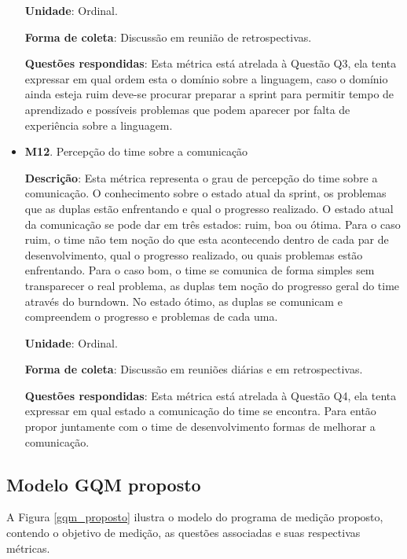 \begin{itemize}
	   \subitem \textbf{Unidade}: Ordinal. 
	   
	   \subitem \textbf{Forma de coleta}: Discussão em reunião de retrospectivas.
	   
	   \subitem \textbf{Questões respondidas}: Esta métrica está atrelada à Questão Q3, ela tenta expressar em 
	   qual ordem esta o domínio sobre a linguagem, caso o domínio ainda esteja ruim deve-se procurar preparar a 
	   sprint para permitir tempo de aprendizado e possíveis problemas que podem aparecer por falta de experiência 
	   sobre a linguagem.
	
	 \item \textbf{M12}. Percepção do time sobre a comunicação
	 
	    \subitem \textbf{Descrição}: Esta métrica representa o grau de percepção do time sobre a comunicação. O
	     conhecimento sobre o estado atual da sprint, os problemas que as duplas estão enfrentando e qual o
	      progresso realizado. O estado atual da comunicação se pode dar em três estados: ruim, boa ou ótima. Para
	       o caso ruim, o time não tem noção do que esta acontecendo dentro de cada par de desenvolvimento, qual o
	        progresso realizado, ou quais problemas estão enfrentando. Para o caso bom, o time se comunica de
	         forma simples sem transparecer o real problema, as duplas tem noção do progresso geral do time
	          através do burndown. No estado ótimo, as duplas se comunicam e compreendem o progresso e problemas
	           de cada uma.
	   
	   \subitem \textbf{Unidade}: Ordinal. 
	   
	   \subitem \textbf{Forma de coleta}: Discussão em reuniões diárias e em retrospectivas.
	   
	   \subitem \textbf{Questões respondidas}: Esta métrica está atrelada à Questão Q4, ela tenta expressar em
	    qual estado a comunicação do time se encontra. Para então propor juntamente com o time de desenvolvimento
	     formas de melhorar a comunicação.
		    
	\end{itemize}

      \vfill
      \pagebreak
      \subsection{Modelo GQM proposto}

	A Figura \ref{gqm_proposto} ilustra o modelo do programa de medição proposto, contendo o objetivo de medição, as
	questões associadas e suas respectivas métricas.

